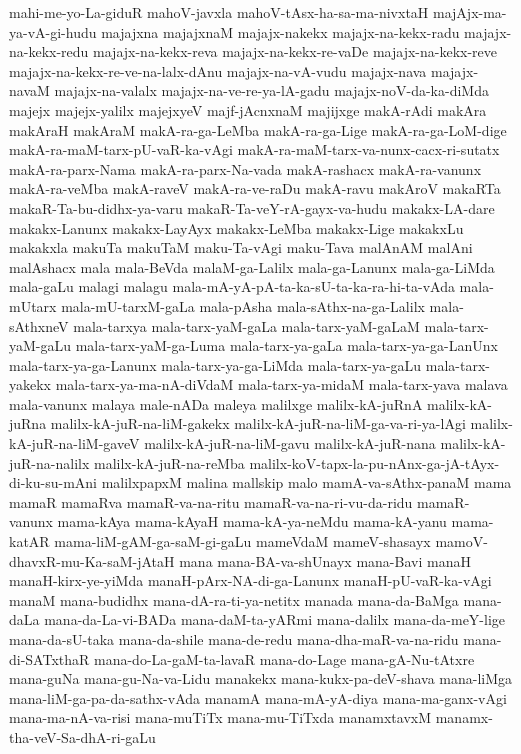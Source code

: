 {mahi-me-yo-La-giduR
mahoV-javxla
mahoV-tAsx-ha-sa-ma-nivxtaH
majAjx-ma-ya-vA-gi-hudu
majajxna
majajxnaM
majajx-nakekx
majajx-na-kekx-radu
majajx-na-kekx-redu
majajx-na-kekx-reva
majajx-na-kekx-re-vaDe
majajx-na-kekx-reve
majajx-na-kekx-re-ve-na-lalx-dAnu
majajx-na-vA-vudu
majajx-nava
majajx-navaM
majajx-na-valalx
majajx-na-ve-re-ya-lA-gadu
majajx-noV-da-ka-diMda
majejx
majejx-yalilx
majejxyeV
majf-jAcnxnaM
majijxge
makA-rAdi
makAra
makAraH
makAraM
makA-ra-ga-LeMba
makA-ra-ga-Lige
makA-ra-ga-LoM-dige
makA-ra-maM-tarx-pU-vaR-ka-vAgi
makA-ra-maM-tarx-va-nunx-cacx-ri-sutatx
makA-ra-parx-Nama
makA-ra-parx-Na-vada
makA-rashacx
makA-ra-vanunx
makA-ra-veMba
makA-raveV
makA-ra-ve-raDu
makA-ravu
makAroV
makaRTa
makaR-Ta-bu-didhx-ya-varu
makaR-Ta-veY-rA-gayx-va-hudu
makakx-LA-dare
makakx-Lanunx
makakx-LayAyx
makakx-LeMba
makakx-Lige
makakxLu
makakxla
makuTa
makuTaM
maku-Ta-vAgi
maku-Tava
malAnAM
malAni
malAshacx
mala
mala-BeVda
malaM-ga-Lalilx
mala-ga-Lanunx
mala-ga-LiMda
mala-gaLu
malagi
malagu
mala-mA-yA-pA-ta-ka-sU-ta-ka-ra-hi-ta-vAda
mala-mUtarx
mala-mU-tarxM-gaLa
mala-pAsha
mala-sAthx-na-ga-Lalilx
mala-sAthxneV
mala-tarxya
mala-tarx-yaM-gaLa
mala-tarx-yaM-gaLaM
mala-tarx-yaM-gaLu
mala-tarx-yaM-ga-Luma
mala-tarx-ya-gaLa
mala-tarx-ya-ga-LanUnx
mala-tarx-ya-ga-Lanunx
mala-tarx-ya-ga-LiMda
mala-tarx-ya-gaLu
mala-tarx-yakekx
mala-tarx-ya-ma-nA-diVdaM
mala-tarx-ya-midaM
mala-tarx-yava
malava
mala-vanunx
malaya
male-nADa
maleya
malilxge
malilx-kA-juRnA
malilx-kA-juRna
malilx-kA-juR-na-liM-gakekx
malilx-kA-juR-na-liM-ga-va-ri-ya-lAgi
malilx-kA-juR-na-liM-gaveV
malilx-kA-juR-na-liM-gavu
malilx-kA-juR-nana
malilx-kA-juR-na-nalilx
malilx-kA-juR-na-reMba
malilx-koV-tapx-la-pu-nAnx-ga-jA-tAyx-di-ku-su-mAni
malilxpapxM
malina
mallskip
malo
mamA-va-sAthx-panaM
mama
mamaR
mamaRva
mamaR-va-na-ritu
mamaR-va-na-ri-vu-da-ridu
mamaR-vanunx
mama-kAya
mama-kAyaH
mama-kA-ya-neMdu
mama-kA-yanu
mama-katAR
mama-liM-gAM-ga-saM-gi-gaLu
mameVdaM
mameV-shasayx
mamoV-dhavxR-mu-Ka-saM-jAtaH
mana
mana-BA-va-shUnayx
mana-Bavi
manaH
manaH-kirx-ye-yiMda
manaH-pArx-NA-di-ga-Lanunx
manaH-pU-vaR-ka-vAgi
manaM
mana-budidhx
mana-dA-ra-ti-ya-netitx
manada
mana-da-BaMga
mana-daLa
mana-da-La-vi-BADa
mana-daM-ta-yARmi
mana-dalilx
mana-da-meY-lige
mana-da-sU-taka
mana-da-shile
mana-de-redu
mana-dha-maR-va-na-ridu
mana-di-SATxthaR
mana-do-La-gaM-ta-lavaR
mana-do-Lage
mana-gA-Nu-tAtxre
mana-guNa
mana-gu-Na-va-Lidu
manakekx
mana-kukx-pa-deV-shava
mana-liMga
mana-liM-ga-pa-da-sathx-vAda
manamA
mana-mA-yA-diya
mana-ma-ganx-vAgi
mana-ma-nA-va-risi
mana-muTiTx
mana-mu-TiTxda
manamxtavxM
manamx-tha-veV-Sa-dhA-ri-gaLu
}
